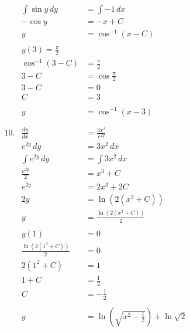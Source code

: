 \documentclass[12pt]{article}
\begin{document}
\begin{multicols}{2}
\begin{align*}
        &&\int \sin \! y\,dy &= \int -1\,dx \\
        &&-\cos y &= -x + C \\
        &&y &= \cos^{-1}(x - C) \\ \\
        &&y(3) = \frac{\pi}{2} \\
        &&\cos^{-1}(3 - C) &= \frac{\pi}{2} \\
        &&3 - C &= \cos \frac{\pi}{2} \\
        &&3 - C &= 0 \\
        &&C &= 3 \\ \\
        &&y &= \cos^{-1}(x - 3) \\ \\ \\
        &10.& \frac{dy}{dx} &= \frac{3x^2}{e^{2y}} \\
        &&e^{2y}\,dy &= 3x^2\,dx \\
        &&\int e^{2y}\,dy &= \int 3x^2\,dx \\
        &&\frac{e^{2y}}{2} &= x^3 + C \\
        &&e^{2y} &= 2x^3 +2C \\
        &&2y &= \ln \left( 2\left(x^3 + C\right) \right) \\
        &&y &= \frac{\ln \left( 2\left(x^3 + C\right) \right)}{2} \\ \\
        &&y(1) &= 0 \\
        &&\frac{\ln \left( 2\left(1^2 + C\right) \right)}{2} &= 0 \\
        &&2\left(1^2+C\right) &= 1 \\
        &&1+C &= \frac{1}{2} \\
        &&C &= -\frac{1}{2} \\ \\
        &&y &= \ln \left( \sqrt{x^2 - \frac{1}{2}} \right) + \ln \sqrt{2} \\ \\ \\
    \end{align*}
\end{multicols}



\end{document}
